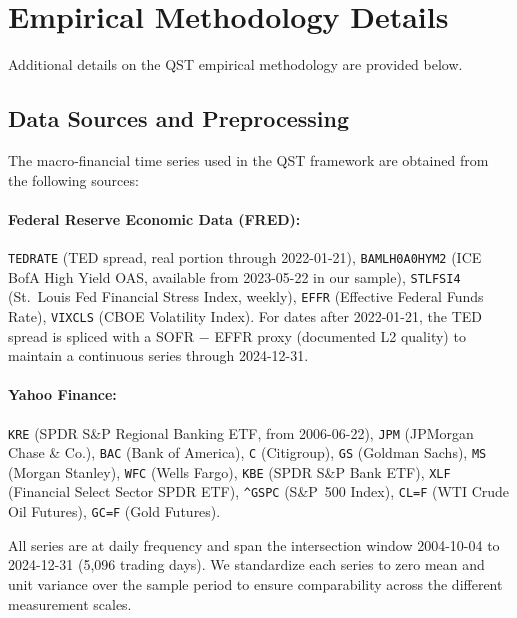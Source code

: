 
\section{Empirical Methodology Details}\label{app:empirical-methodology}

Additional details on the QST empirical methodology are provided below.

\subsection{Data Sources and Preprocessing}\label{sec:data-sources}

The macro-financial time series used in the QST framework are obtained from the
following sources:

\paragraph{Federal Reserve Economic Data (FRED):}
\texttt{TEDRATE} (TED spread, real portion through 2022-01-21),
\texttt{BAMLH0A0HYM2} (ICE BofA High Yield OAS, available from 2023-05-22 in
our sample), \texttt{STLFSI4} (St.~Louis Fed Financial Stress Index, weekly),
\texttt{EFFR} (Effective Federal Funds Rate), \texttt{VIXCLS} (CBOE Volatility
Index). For dates after 2022-01-21, the TED spread is spliced with a SOFR $-$
EFFR proxy (documented L2 quality) to maintain a continuous series through
2024-12-31.

\paragraph{Yahoo Finance:}
\texttt{KRE} (SPDR S\&P Regional Banking ETF, from 2006-06-22), \texttt{JPM}
(JPMorgan Chase \& Co.), \texttt{BAC} (Bank of America), \texttt{C} (Citigroup),
\texttt{GS} (Goldman Sachs), \texttt{MS} (Morgan Stanley), \texttt{WFC} (Wells
Fargo), \texttt{KBE} (SPDR S\&P Bank ETF), \texttt{XLF} (Financial Select Sector
SPDR ETF), \texttt{\^{}GSPC} (S\&P~500 Index), \texttt{CL=F} (WTI Crude Oil
Futures), \texttt{GC=F} (Gold Futures).

All series are at daily frequency and span the intersection window
2004-10-04 to 2024-12-31 (5{,}096 trading days). We standardize each series to
zero mean and unit variance over the sample period to ensure comparability across
the different measurement scales.

